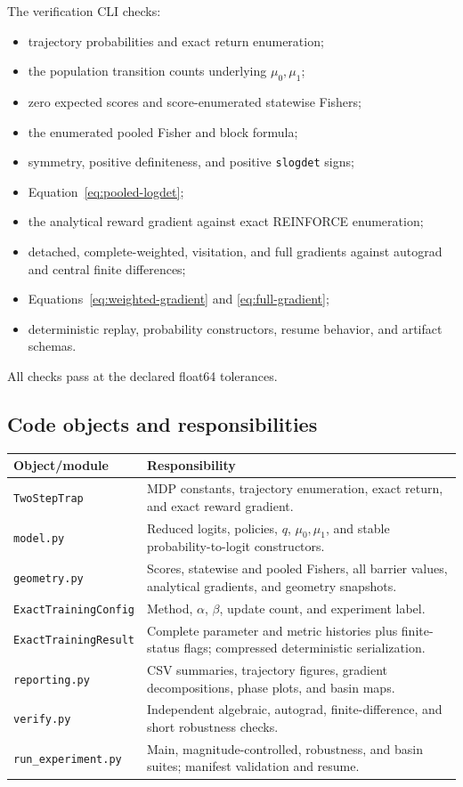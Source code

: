 \documentclass[10pt,a4paper]{article}
\begin{document}
The verification CLI checks:
\begin{itemize}
\item trajectory probabilities and exact return enumeration;
\item the population transition counts underlying $\mu_0,\mu_1$;
\item zero expected scores and score-enumerated statewise Fishers;
\item the enumerated pooled Fisher and block formula;
\item symmetry, positive definiteness, and positive \texttt{slogdet} signs;
\item Equation~\eqref{eq:pooled-logdet};
\item the analytical reward gradient against exact REINFORCE enumeration;
\item detached, complete-weighted, visitation, and full gradients against
autograd and central finite differences;
\item Equations~\eqref{eq:weighted-gradient} and \eqref{eq:full-gradient};
\item deterministic replay, probability constructors, resume behavior, and
artifact schemas.
\end{itemize}
All checks pass at the declared float64 tolerances.

\subsection{Code objects and responsibilities}

\begin{center}\small
\begin{tabularx}{\textwidth}{lX}
\toprule
Object/module & Responsibility\\ \midrule
\texttt{TwoStepTrap} & MDP constants, trajectory enumeration, exact return,
and exact reward gradient.\\
\texttt{model.py} & Reduced logits, policies, $q$, $\mu_0,\mu_1$, and stable
probability-to-logit constructors.\\
\texttt{geometry.py} & Scores, statewise and pooled Fishers, all barrier values,
analytical gradients, and geometry snapshots.\\
\texttt{ExactTrainingConfig} & Method, $\alpha$, $\beta$, update count, and
experiment label.\\
\texttt{ExactTrainingResult} & Complete parameter and metric histories plus
finite-status flags; compressed deterministic serialization.\\
\texttt{reporting.py} & CSV summaries, trajectory figures, gradient
decompositions, phase plots, and basin maps.\\
\texttt{verify.py} & Independent algebraic, autograd, finite-difference, and
short robustness checks.\\
\texttt{run\_experiment.py} & Main, magnitude-controlled, robustness, and basin
suites; manifest validation and resume.\\ \bottomrule
\end{tabularx}
\end{center}
\end{document}
